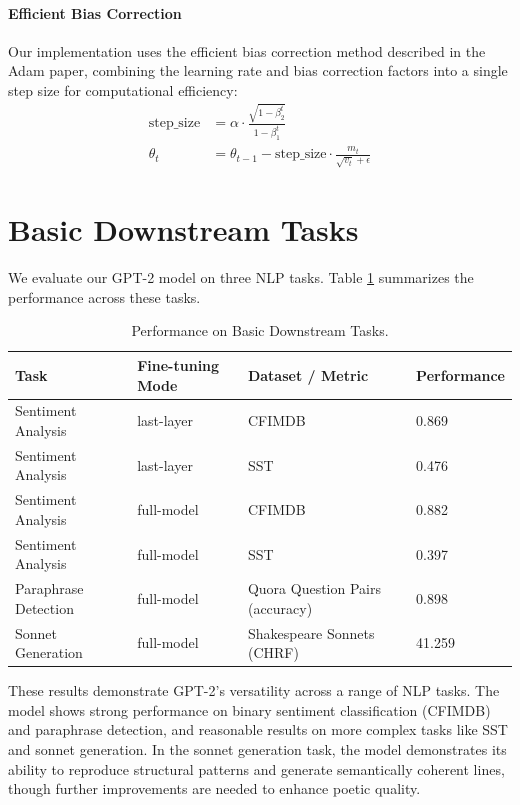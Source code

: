 \documentclass{article}
\begin{document}
\paragraph{Efficient Bias Correction}
Our implementation uses the efficient bias correction method described in the Adam paper, combining the learning rate and bias correction factors into a single step size for computational efficiency:
\begin{align*}
    \text{step\_size} &= \alpha \cdot \frac{\sqrt{1 - \beta_2^t}}{1 - \beta_1^t} \\
    \theta_t &= \theta_{t-1} - \text{step\_size} \cdot \frac{m_t}{\sqrt{v_t} + \epsilon}
\end{align*}

\section{Basic Downstream Tasks}
We evaluate our GPT-2 model on three NLP tasks. Table \ref{tab:downstream_results} summarizes the performance across these tasks.

\begin{table}[h]
\centering
\begin{tabular}{llll}
\toprule
\textbf{Task} & \textbf{Fine-tuning Mode} & \textbf{Dataset / Metric} & \textbf{Performance} \\
\midrule
Sentiment Analysis & last-layer & CFIMDB & 0.869 \\
Sentiment Analysis & last-layer & SST & 0.476 \\
Sentiment Analysis & full-model & CFIMDB & 0.882 \\
Sentiment Analysis & full-model & SST & 0.397 \\
\midrule
Paraphrase Detection & full-model & Quora Question Pairs (accuracy) & 0.898 \\
Sonnet Generation & full-model & Shakespeare Sonnets (CHRF) & 41.259 \\
\bottomrule
\end{tabular}
\caption{Performance on Basic Downstream Tasks.}
\label{tab:downstream_results}
\end{table}

These results demonstrate GPT-2's versatility across a range of NLP tasks. The model shows strong performance on binary sentiment classification (CFIMDB) and paraphrase detection, and reasonable results on more complex tasks like SST and sonnet generation. In the sonnet generation task, the model demonstrates its ability to reproduce structural patterns and generate semantically coherent lines, though further improvements are needed to enhance poetic quality.
\end{document}

